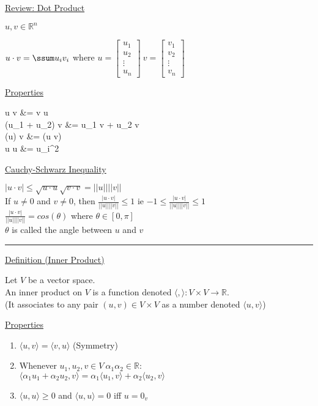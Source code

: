 \documentclass[12pt]{article}
\newcommand\m[1]{\begin{bmatrix}#1\end{bmatrix}}
\newcommand{\real}[0]{\mathbb{R}}
\newenvironment{block}[1][Label]{\underline{#1}\par}{}
\newcommand{\bbb}[1]{\left[#1\right]}
\newcommand{\abs}[1]{\left|#1\right|}
\newcommand{\ang}[1]{\langle#1\rangle}
\newcommand{\divider}[0]{\par\textcolor{lightgray}{\rule{\textwidth}{0.1pt}}}
\newenvironment{eqn}{\equation\alignedat{3}}{\endalignedat\endequation}
\begin{document}
	\begin{block}[Review: Dot Product]
	$u, v \in \real^n$
	
	$u \cdot v = \ssum u_i v_i$ where $u = \m{u_1 \\ u_2 \\ \vdots \\ u_n} \ v = \m{v_1 \\ v_2 \\ \vdots \\ v_n}$
	
	\begin{block}[Properties]
		\begin{eqn}
			u \cdot v &= v \cdot u \\
			(u_1 + u_2) \cdot v &= u_1 \cdot v + u_2 \cdot v \\
			(\alpha u) \cdot v &= \alpha (u \cdot v) \\ 
			u \cdot u &= \ssum u_i^2 
		\end{eqn}
	\end{block}
	
	\end{block}

	\begin{block}[Cauchy-Schwarz Inequality]
		$\abs{u \cdot v} \le \sqrt{u \cdot u} \sqrt{v \cdot v} = \abs{\abs{u}} \abs{\abs{v}}$ \\ 
		If $u \ne 0$ and $v \ne 0$, then $\frac{\abs{u \cdot v}}{\abs{\abs{u}} \abs{\abs{v}}} \le 1$ \quad ie $-1 \le \frac{\abs{u \cdot v}}{\abs{\abs{u}} \abs{\abs{v}}} \le 1$ \\
		$\frac{\abs{u \cdot v}}{\abs{\abs{u}} \abs{\abs{v}}} = cos(\theta)$ where $\theta \in \bbb{0, \pi}$ \\
		$\theta$ is called the angle between $u$ and $v$
	\end{block}
	
	\divider
	
	\begin{block}[Definition (Inner Product)]
		Let $V$ be a vector space. \\
		An inner product on $V$ is a function denoted $\ang{,}: V \times V \rightarrow \real$. \\
		(It associates to any pair $(u, v) \in V \times V$ as a number denoted $\ang{u, v}$)
		
		\begin{block}[Properties]
			\begin{enumerate}
				\item $\ang{u, v} = \ang{v, u}$ \quad (Symmetry)
				\item Whenever $u_1, u_2, v \in V \ \alpha_1 \alpha_2 \in \real$: \\
				$\ang{\alpha_1 u_1 + \alpha_2 u_2, v} = \alpha_1 \ang{u_1, v} + \alpha_2 \ang{u_2, v}$
				\item $\ang{u, u} \ge 0$ and $\ang{u, u} = 0$ iff $u = 0_v$
			\end{enumerate}
		\end{block}
	\end{block}
\end{document}
